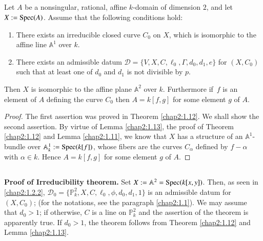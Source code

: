\subsection{}\label{chap2:1.14}
\begin{theorem*}
  Let $A$ be a nonsingular, rational, affine $k$-domain of dimension
  $2$, and let $X:=\operatorname{Spec}(A)$. Assume that the following conditions hold:
  \begin{enumerate}
    \renewcommand{\labelenumi}{\rm(\theenumi)}
  \item There exists an irreducible closed curve $C_{0}$ on $X$, which
    is isomorphic to the affine line $\mathbb{A}^{1}$ over $k$.
    
  \item There exists an admissible datum
    $\mathscr{D}=\{V,X,C,\ell_{0},\Gamma,d_{0},d_{1},e\}$ for
    $(X,C_{0})$ such that at least one of $d_{0}$ and $d_{1}$ is not
    divisible by $p$.
  \end{enumerate}
  Then $X$ is isomorphic to the affine plane $\mathbb{A}^{2}$ over
  $k$. Furthermore if\pageoriginale\ $f$ is an element of $A$ defining
  the curve $C_{0}$ then $A=k[f,g]$ for some element $g$ of $A$.
\end{theorem*}

\begin{proof}
The first assertion was proved in Theorem \ref{chap2:1.12}. We shall show
the second assertion. By virtue of Lemma \ref{chap2:1.13}, the proof of
Theorem \ref{chap2:1.12} and Lemma \ref{chap2:1.11}, we know that $X$ has a
structure of an $\mathbb{A}^{1}$-bundle over
$\mathbb{A}^{1}_{k}:=\operatorname{Spec}(k[f])$, whose fibers are the curves
$C_{\alpha}$ defined by $f-\alpha$ with $\alpha\in k$. Hence
$A=k[f,g]$ for some element $g$ of $A$.
\end{proof}

\subsection{}\label{chap2:1.15}
\noindent \textbf{Proof of Irreducibility theorem.} 
Set $X:=\mathbb{A}^{2}=\operatorname{Spec}(k[x,y])$. Then, as seen in \ref{chap2:1.2.2},
$\mathscr{D}_{0}=\{\mathbb{P}^{2}_{k},X,C,\ell_{0},\phi,d_{0},d_{1},1\}$
is an admissible datum for $(X,C_{0})$; (for the notations, see the
paragraph \ref{chap2:1.1}). We may assume that $d_{0}>1$; if otherwise, $C$
is a line on $\mathbb{P}^{2}_{k}$ and the assertion of the theorem is
apparently true. If $d_{0}>1$, the theorem follows from Theorem
\ref{chap2:1.12} and Lemma \ref{chap2:1.13}.

